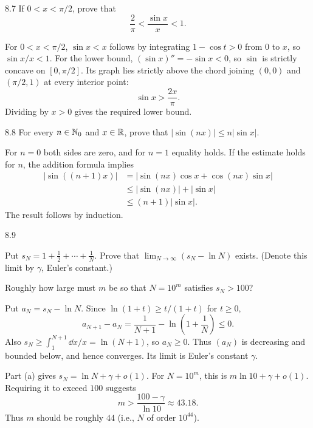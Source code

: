 \documentclass[11pt, oneside]{article}
\begin{document}
\begin{exercise}{8.7}
If $0<x<\pi/2$, prove that
\[
 \frac2\pi<\frac{\sin x}{x}<1.
\]
\end{exercise}
\begin{solution}
For $0<x<\pi/2$, $\sin x<x$ follows by integrating $1-\cos t>0$ from $0$ to $x$, so $\sin x/x<1$. For the lower bound, $(\sin x)''=-\sin x<0$, so $\sin$ is strictly concave on $[0, \pi/2]$. Its graph lies strictly above the chord joining $(0, 0)$ and $(\pi/2, 1)$ at every interior point:
\[
 \sin x>\frac{2x}{\pi}.
\]
Dividing by $x>0$ gives the required lower bound.
\end{solution}

\begin{exercise}{8.8}
For every $n\in\mathbb{N}_0$ and $x\in\mathbb{R}$, prove that $|\sin(nx)|\le n|\sin x|$.
\end{exercise}
\begin{solution}
For $n=0$ both sides are zero, and for $n=1$ equality holds. If the estimate holds for $n$, the addition formula implies
\[
 \begin{aligned}
 |\sin((n+1)x)|
 &=|\sin(nx)\cos x+\cos(nx)\sin x|\\
 &\le|\sin(nx)|+|\sin x|\\
 &\le(n+1)|\sin x|.
 \end{aligned}
\]
The result follows by induction.
\end{solution}

\begin{exercise}{8.9}
\begin{exercisesubparts}
\item Put $s_N=1+\frac12+\cdots+\frac1N$. Prove that $\displaystyle\lim_{N\to\infty}(s_N-\ln N)$ exists. (Denote this limit by $\gamma$, Euler's constant.)
\item Roughly how large must $m$ be so that $N=10^m$ satisfies $s_N>100$?
\end{exercisesubparts}
\end{exercise}
\begin{solution}
\begin{exercisesubparts}
\item Put $a_N=s_N-\ln N$. Since $\ln(1+t)\ge t/(1+t)$ for $t\ge0$,
\[
 a_{N+1}-a_N=\frac1{N+1}-\ln\left(1+\frac1N\right)\le0.
\]
Also $s_N\ge\int_1^{N+1}\dd x/x=\ln(N+1)$, so $a_N\ge0$. Thus $(a_N)$ is decreasing and bounded below, and hence converges. Its limit is Euler's constant $\gamma$.
\item Part (a) gives $s_N=\ln N+\gamma+o(1)$. For $N=10^m$, this is $m\ln10+\gamma+o(1)$. Requiring it to exceed $100$ suggests
\[
 m>\frac{100-\gamma}{\ln10}\approx43.18.
\]
Thus $m$ should be roughly $44$ (i.e., $N$ of order $10^{44}$).
\end{exercisesubparts}
\end{solution}
\end{document}
